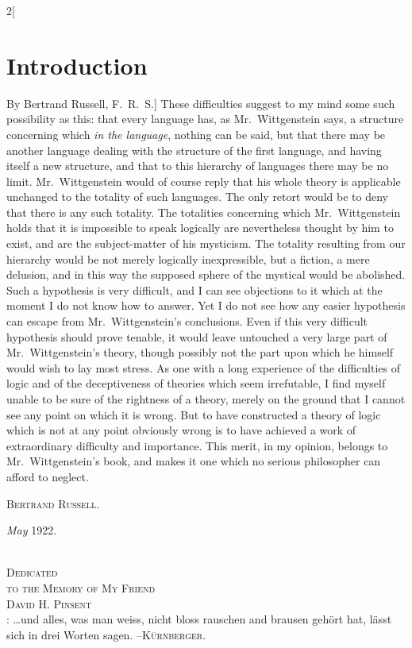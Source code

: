 \documentclass[oneside,openany,12pt]{book}
\newcommand{\germph}[1]{\so{#1}} %
\begin{document}
\begin{multicols}{2}[\section*{Introduction}By Bertrand Russell, F.\ R.\ S.]
These difficulties suggest to my mind some such possibility as this: that every language has, as Mr.\ Wittgenstein says, a structure concerning which \emph{in the language}, nothing can be said, but that there may be another language dealing with the structure of the first language, and having itself a new structure, and that to this hierarchy of languages there may be no limit. Mr.\ Wittgenstein would of course reply that his whole theory is applicable unchanged to the totality of such languages. The only retort would be to deny that there is any such totality. The totalities concerning which Mr.\ Wittgenstein holds that it is impossible to speak logically are nevertheless thought by him to exist, and are the subject-matter of his mysticism. The totality resulting from our hierarchy would be not merely logically inexpressible, but a fiction, a mere delusion, and in this way the supposed sphere of the mystical would be abolished. Such a hypothesis is very difficult, and I can see objections to it which at the moment I do not know how to answer. Yet I do not see how any easier hypothesis can escape from Mr.\ Wittgenstein's conclusions. Even if this very difficult hypothesis should prove tenable, it would leave untouched a very large part of Mr.\ Wittgenstein's theory, though possibly not the part upon which he himself would wish to lay most stress. As one with a long experience of the difficulties of logic and of the deceptiveness of theories which seem irrefutable, I find myself unable to be sure of the rightness of a theory, merely on the ground that I cannot see any point on which it is wrong. But to have constructed a theory of logic which is not at any point obviously wrong is to have achieved a work of extraordinary difficulty and importance. This merit, in my opinion, belongs to Mr.\ Wittgenstein's book, and makes it one which no serious philosopher can afford to neglect.

\hfill\textsc{Bertrand Russell.}\phantom{xxx} %


\textit{May} 1922.
\end{multicols}
\clearpage{}\thispagestyle{empty}
\begin{center}
\vspace*{50pt}{\Huge Tractatus Logico-Philosophicus}\\[150pt]
{\textsc{Dedicated}}\\
{\textsc{to the Memory of My Friend}}\\[12pt]
{\Large\textsc{David H. Pinsent}}\\[150pt]
{\germph{Motto}: \ldots und alles, was man weiss, nicht bloss rauschen and brausen geh{\"o}rt hat, l{\"a}sst sich in drei Worten sagen.}
{\quad\textsc{--K{\"u}rnberger.}}
\end{center}
\end{document}
